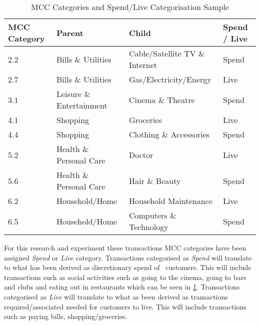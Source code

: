 \begin{table}[H]
	\centering
	\resizebox{\textwidth}{!}
	{
		\label{my-label}
		\begin{tabular}{|l|l|l|l|}
			\hline
			\textbf{MCC Category} & \textbf{Parent}          & \textbf{Child}                 & \textbf{Spend / Live} \\ \hline
			2.2                   & Bills \& Utilities       & Cable/Satellite TV \& Internet & Spend                 \\ \hline
			2.7                   & Bills \& Utilities       & Gas/Electricity/Energy         & Live                  \\ \hline
			3.1                   & Leisure \& Entertainment & Cinema \& Theatre              & Spend                 \\ \hline
			4.1                   & Shopping                 & Groceries                     & Live                  \\ \hline
			4.4                   & Shopping                 & Clothing \& Accessories        & Spend                 \\ \hline
			5.2                   & Health \& Personal Care  & Doctor                         & Live                  \\ \hline
			5.6                   & Health \& Personal Care  & Hair \& Beauty                 & Spend                 \\ \hline
			6.2                   & Household/Home           & Household Maintenance          & Live                  \\ \hline
			6.5                   & Household/Home           & Computers \& Technology        & Spend                 \\ \hline
		\end{tabular}
	}
	\caption{MCC Categories and Spend/Live Categorisation Sample}
	\label{table:mcc}
\end{table}

For this research and experiment these transactions MCC categories have been assigned \textit{Spend} or \textit{Live} category. Transactions categorised as \textit{Spend} will translate to what has been derived as discretionary spend of \subjectname\ customers. This will include transactions such as social activities such as going to the cinema, going to bars and clubs and eating out in restaurants which can be seen in \ref{table:mcc}. Transactions categorised as \textit{Live} will translate to what as been derived as transactions required/associated needed for customers to live. This will include transactions such as paying bills, shopping/groceries.


